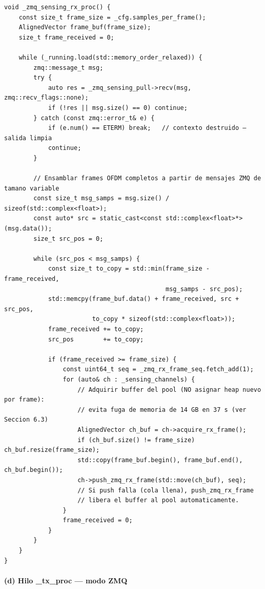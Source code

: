 \documentclass[11pt,a4paper]{article}
\begin{document}
\begin{lstlisting}[style=cpp,
  caption={Hilo de recepción ZMQ sensing — OFDMModulator.cpp, lineas 1432--1482}]
void _zmq_sensing_rx_proc() {
    const size_t frame_size = _cfg.samples_per_frame();
    AlignedVector frame_buf(frame_size);
    size_t frame_received = 0;

    while (_running.load(std::memory_order_relaxed)) {
        zmq::message_t msg;
        try {
            auto res = _zmq_sensing_pull->recv(msg, zmq::recv_flags::none);
            if (!res || msg.size() == 0) continue;
        } catch (const zmq::error_t& e) {
            if (e.num() == ETERM) break;   // contexto destruido — salida limpia
            continue;
        }

        // Ensamblar frames OFDM completos a partir de mensajes ZMQ de tamano variable
        const size_t msg_samps = msg.size() / sizeof(std::complex<float>);
        const auto* src = static_cast<const std::complex<float>*>(msg.data());
        size_t src_pos = 0;

        while (src_pos < msg_samps) {
            const size_t to_copy = std::min(frame_size - frame_received,
                                            msg_samps - src_pos);
            std::memcpy(frame_buf.data() + frame_received, src + src_pos,
                        to_copy * sizeof(std::complex<float>));
            frame_received += to_copy;
            src_pos        += to_copy;

            if (frame_received >= frame_size) {
                const uint64_t seq = _zmq_rx_frame_seq.fetch_add(1);
                for (auto& ch : _sensing_channels) {
                    // Adquirir buffer del pool (NO asignar heap nuevo por frame):
                    // evita fuga de memoria de 14 GB en 37 s (ver Seccion 6.3)
                    AlignedVector ch_buf = ch->acquire_rx_frame();
                    if (ch_buf.size() != frame_size) ch_buf.resize(frame_size);
                    std::copy(frame_buf.begin(), frame_buf.end(), ch_buf.begin());
                    ch->push_zmq_rx_frame(std::move(ch_buf), seq);
                    // Si push falla (cola llena), push_zmq_rx_frame
                    // libera el buffer al pool automaticamente.
                }
                frame_received = 0;
            }
        }
    }
}
\end{lstlisting}

\paragraph{(d) Hilo \_tx\_proc — modo ZMQ}
\end{document}
